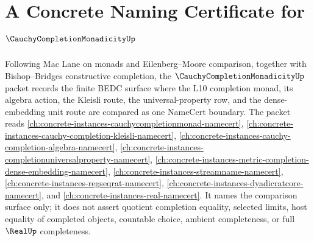 \chapter{A Concrete Naming Certificate for $\CauchyCompletionMonadicityUp$}
\label{ch:concrete-instances-cauchy-completion-monadicity-namecert}

Following Mac Lane on monads and Eilenberg--Moore comparison, together with Bishop--Bridges constructive completion, the $\CauchyCompletionMonadicityUp$ packet records the finite BEDC surface where the L10 completion monad, its algebra action, the Kleisli route, the universal-property row, and the dense-embedding unit route are compared as one NameCert boundary. The packet reads \autoref{ch:concrete-instances-cauchycompletionmonad-namecert}, \autoref{ch:concrete-instances-cauchy-completion-kleisli-namecert}, \autoref{ch:concrete-instances-cauchy-completion-algebra-namecert}, \autoref{ch:concrete-instances-completionuniversalproperty-namecert}, \autoref{ch:concrete-instances-metric-completion-dense-embedding-namecert}, \autoref{ch:concrete-instances-streamname-namecert}, \autoref{ch:concrete-instances-regseqrat-namecert}, \autoref{ch:concrete-instances-dyadicratcore-namecert}, and \autoref{ch:concrete-instances-real-namecert}. It names the comparison surface only; it does not assert quotient completion equality, selected limits, host equality of completed objects, countable choice, ambient completeness, or full $\RealUp$ completeness.

